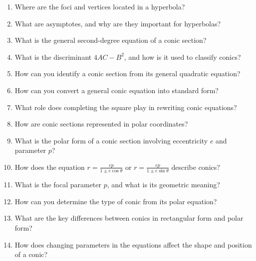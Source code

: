 \begin{enumerate}
  \item Where are the foci and vertices located in a hyperbola?
  \item What are asymptotes, and why are they important for hyperbolas?
  \item What is the general second-degree equation of a conic section?
  \item What is the discriminant $4AC - B^2$, and how is it used to classify conics?
  \item How can you identify a conic section from its general quadratic equation?
  \item How can you convert a general conic equation into standard form?
  \item What role does completing the square play in rewriting conic equations?
  \item How are conic sections represented in polar coordinates?
  \item What is the polar form of a conic section involving eccentricity $e$ and parameter $p$?
  \item How does the equation $r = \frac{ep}{1 \pm e\cos\theta}$ or $r = \frac{ep}{1 \pm e\sin\theta}$ describe conics?
  \item What is the focal parameter $p$, and what is its geometric meaning?
  \item How can you determine the type of conic from its polar equation?
  \item What are the key differences between conics in rectangular form and polar form?
  \item How does changing parameters in the equations affect the shape and position of a conic?
\end{enumerate}
